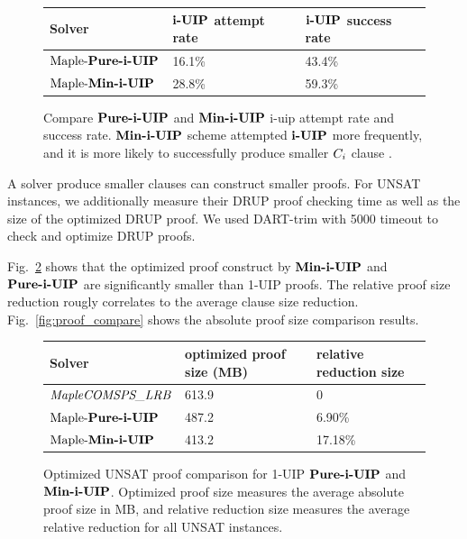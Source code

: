 \begin{figure} 
\begin{center} 
\begin{tabular}{ | m{3.5cm} | m{5cm}| m{5cm} | } 
\hline
Solver & $\textbf{i-UIP}$ attempt rate & $\textbf{i-UIP}$ success rate  \\ 
\hline
$\text{Maple-\textbf{Pure-i-UIP}}$ & 16.1\% & 43.4\% \\ 
\hline
$\text{Maple-\textbf{Min-i-UIP}}$ & 28.8\% & 59.3\% \\ 
\hline
\end{tabular}
\end{center}
\caption{Compare $\textbf{Pure-i-UIP}$ and $\textbf{Min-i-UIP}$ i-uip attempt rate and success rate. $\textbf{Min-i-UIP}$ scheme attempted $\textbf{i-UIP}$ more frequently, and it is more likely to successfully produce smaller $C_{i}$ clause .}
\label{fig:t2}
\end{figure}

A solver produce smaller clauses can construct smaller proofs. For UNSAT instances, we additionally measure their DRUP\cite{} proof checking time as well as the size of the optimized DRUP proof. We used DART-trim \cite{} with 5000 timeout to check and optimize DRUP proofs. 

Fig.~\ref{fig:t3} shows that the optimized proof construct by $\textbf{Min-i-UIP}$ and $\textbf{Pure-i-UIP}$ are significantly smaller than 1-UIP proofs. The relative proof size reduction rougly correlates to the average clause size reduction. Fig.~\ref{fig:proof_compare} shows the absolute proof size comparison results. 

\begin{figure} 
\begin{center} 
\begin{tabular}{ | m{3.5cm} | m{5cm}| m{5cm} | } 
\hline
Solver & optimized proof size (MB) & relative reduction size  \\ 
\hline
$\textit{MapleCOMSPS\_LRB}$ & 613.9 & 0  \\ 
\hline
$\text{Maple-\textbf{Pure-i-UIP}}$ & 487.2 & 6.90\% \\ 
\hline
$\text{Maple-\textbf{Min-i-UIP}}$ & 413.2 & 17.18\% \\ 
\hline
\end{tabular}
\end{center}
\caption{Optimized UNSAT proof comparison for 1-UIP $\textbf{Pure-i-UIP}$ and $\textbf{Min-i-UIP}$. Optimized proof size measures the average absolute proof size in MB, and relative reduction size measures the average relative reduction for all UNSAT instances.}
\label{fig:t3}
\end{figure}


